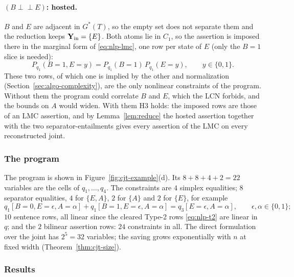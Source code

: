 \documentclass{article} %
\newcommand{\indep}{\perp\!\!\!\perp}
\begin{document}
\paragraph{$(B\indep E)$: hosted.}
$B$ and $E$ are adjacent in $G^\ast(T)$, so the empty set does not separate them and
the reduction keeps $\mathbf{Y}_{\mathrm{in}}=\{E\}$. Both atoms lie in $C_1$, so the
assertion is imposed there in the marginal form of \eqref{eq:nlp-lmc}, one row per
state of $E$ (only the $B{=}1$ slice is needed):
\[
  P_{q_1}(B{=}1,E{=}y)=P_{q_1}(B{=}1)\,P_{q_1}(E{=}y),\qquad y\in\{0,1\}.
\]
These two rows, of which one is implied by the other and normalization
(Section~\ref{sec:algo-complexity}), are the only nonlinear constraints of the
program. Without them the program could correlate $B$ and $E$, which the LCN
forbids, and the bounds on $A$ would widen. With them H3 holds: the imposed rows
are those of an LMC assertion, and by Lemma~\ref{lem:reduce} the hosted assertion
together with the two separator-entailments gives every assertion of the LMC on
every reconstructed joint.

\subsubsection{The program}

The program is shown in Figure~\ref{fig:cjt-example}(d). Its $8+8+4+2=22$
variables are the cells of $q_1,\dots,q_4$. The constraints are $4$ simplex
equalities; $8$ separator equalities, $4$ for $\{E,A\}$, $2$ for $\{A\}$ and $2$
for $\{E\}$, for example
\[
  q_1[B{=}0,E{=}\epsilon,A{=}\alpha]+q_1[B{=}1,E{=}\epsilon,A{=}\alpha]=q_3[E{=}\epsilon,A{=}\alpha],\qquad
  \epsilon,\alpha\in\{0,1\};
\]
$10$ sentence rows, all linear since the cleared Type-2 rows \eqref{eq:nlp-t2}
are linear in $q$; and the $2$ bilinear assertion rows: $24$ constraints in all.
The direct formulation over the joint has $2^5=32$ variables; the saving grows
exponentially with $n$ at fixed width (Theorem~\ref{thm:cjt-size}).

\subsubsection{Results}
\end{document}
